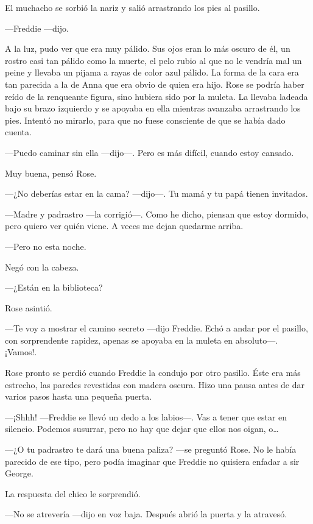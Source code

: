 {El muchacho se sorbió la nariz y salió arrastrando los pies al
pasillo.}

{---Freddie ---dijo.}

{A la luz, pudo ver que era muy pálido. Sus ojos eran lo más oscuro de
él, un rostro casi tan pálido como la muerte, el pelo rubio al que no le
vendría mal un peine y llevaba un pijama a rayas de color azul pálido.
La forma de la cara era tan parecida a la de Anna que era obvio de quien
era hijo. Rose se podría haber reído de la renqueante figura, sino
hubiera sido por la muleta. La llevaba ladeada bajo su brazo izquierdo y
se apoyaba en ella mientras avanzaba arrastrando los pies. Intentó no
mirarlo, para que no fuese consciente de que se había dado cuenta.}

{---Puedo caminar sin ella ---dijo---. Pero es más difícil, cuando estoy
cansado.}

{Muy buena, pensó Rose.}

{---¿No deberías estar en la cama? ---dijo---. Tu mamá y tu papá tienen
invitados.}

{---Madre y padrastro ---la corrigió---. Como he dicho, piensan que
estoy dormido, pero quiero ver quién viene. A veces me dejan quedarme
arriba.}

{---Pero no esta noche.}

{Negó con la cabeza.}

{---¿Están en la biblioteca?}

{Rose asintió.}

{---Te voy a mostrar el camino secreto ---dijo Freddie. Echó a andar por
el pasillo, con sorprendente rapidez, apenas se apoyaba en la muleta en
absoluto---. ¡Vamos!.}

{Rose pronto se perdió cuando Freddie la condujo por otro pasillo. Éste
era más estrecho, las paredes revestidas con madera oscura. Hizo una
pausa antes de dar varios pasos hasta una pequeña puerta.}

{---¡Shhh! ---Freddie se llevó un dedo a los labios---. Vas a tener que
estar en silencio. Podemos susurrar, pero no hay que dejar que ellos nos
oigan, o\ldots{}}

{---¿O tu padrastro te dará una buena paliza? ---se preguntó Rose. No le
había parecido de ese tipo, pero podía imaginar que Freddie no quisiera
enfadar a sir George.}

{La respuesta del chico le sorprendió.}

{---No se atrevería ---dijo en voz baja. Después abrió la puerta y la
atravesó.}

